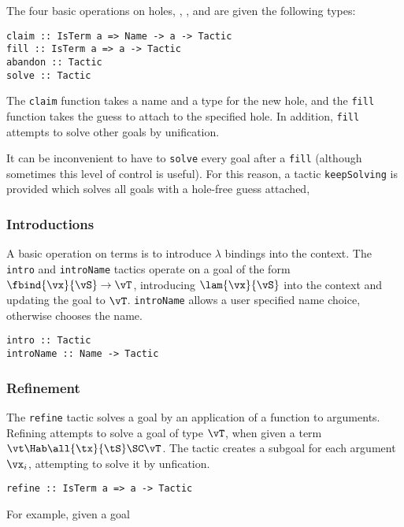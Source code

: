 The four basic operations on holes, , ,
 and  are given the following types:
\begin{verbatim}
claim :: IsTerm a => Name -> a -> Tactic
fill :: IsTerm a => a -> Tactic
abandon :: Tactic
solve :: Tactic
\end{verbatim}

The \texttt{claim} function takes a name and a type for the new hole,
and the \texttt{fill} function takes the guess to attach to the
specified hole. In addition, \texttt{fill} attempts to solve other
goals by unification.

It can be inconvenient to have to \texttt{solve} every goal after a
\texttt{fill} (although sometimes this level of control is
useful). For this reason, a tactic \texttt{keepSolving} is provided
which solves all goals with a hole-free guess attached,

\subsubsection{Introductions}

A basic operation on terms is to introduce $\lambda$ bindings into the
context. The \texttt{intro} and \texttt{introName} tactics operate on
a goal of the form $\fbind{\vx}{\vS}\to\vT$, introducing
$\lam{\vx}{\vS}$ into the context and updating the goal to
$\vT$. \texttt{introName} allows a user specified name choice,
otherwise \Ivor{} chooses the name.

\begin{verbatim}
intro :: Tactic
introName :: Name -> Tactic
\end{verbatim}

\subsubsection{Refinement}

The \texttt{refine} tactic solves a goal by an application of a
function to arguments. Refining attempts to solve a goal of type
$\vT$, when given a term $\vt\Hab\all{\tx}{\tS}\SC\vT$. The tactic
creates a subgoal for each argument $\vx_i$, attempting to solve it by
unfication.

\begin{verbatim}
refine :: IsTerm a => a -> Tactic
\end{verbatim}

For example, given a goal
\DM{
\hole{\vv}{\Vect\:\Nat\:(\suc\:\vn)}
}

